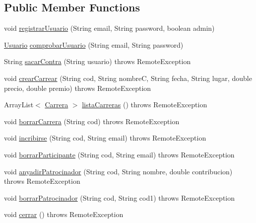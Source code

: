 \subsection*{Public Member Functions}
\begin{DoxyCompactItemize}
\item 
void \mbox{\hyperlink{classes_1_1deusto_1_1server_1_1_server_a0f79b8db6904facdae94410e26bef452}{registrar\+Usuario}} (String email, String password, boolean admin)
\item 
\mbox{\hyperlink{classes_1_1deusto_1_1server_1_1jdo_1_1_usuario}{Usuario}} \mbox{\hyperlink{classes_1_1deusto_1_1server_1_1_server_afa3e758715cbf321f9c1cbe08a8583a4}{comprobar\+Usuario}} (String email, String password)
\item 
String \mbox{\hyperlink{classes_1_1deusto_1_1server_1_1_server_aefe051d880626950ea2964d89a4ae3c3}{sacar\+Contra}} (String usuario)  throws Remote\+Exception 
\item 
void \mbox{\hyperlink{classes_1_1deusto_1_1server_1_1_server_a22d31cd9642f978f1995fc7822d99258}{crear\+Carrear}} (String cod, String nombreC, String fecha, String lugar, double precio, double premio)  throws Remote\+Exception 
\item 
Array\+List$<$ \mbox{\hyperlink{classes_1_1deusto_1_1server_1_1jdo_1_1_carrera}{Carrera}} $>$ \mbox{\hyperlink{classes_1_1deusto_1_1server_1_1_server_af62ce3462ec30a081db0009d2f2b33bb}{lista\+Carreras}} ()  throws Remote\+Exception 
\item 
void \mbox{\hyperlink{classes_1_1deusto_1_1server_1_1_server_a0a3160bdb7bfaab43143f1b0e68aee51}{borrar\+Carrera}} (String cod)  throws Remote\+Exception 
\item 
void \mbox{\hyperlink{classes_1_1deusto_1_1server_1_1_server_a19df52b26da7c83b2e7f13a6aab45633}{incribirse}} (String cod, String email)  throws Remote\+Exception 
\item 
void \mbox{\hyperlink{classes_1_1deusto_1_1server_1_1_server_a60cba3edcdffc7f50d4fa1f55b54ce76}{borrar\+Participante}} (String cod, String email)  throws Remote\+Exception 
\item 
void \mbox{\hyperlink{classes_1_1deusto_1_1server_1_1_server_ab38b8a38462608f1537cd7666e8ce0db}{anyadir\+Patrocinador}} (String cod, String nombre, double contribucion)  throws Remote\+Exception 
\item 
void \mbox{\hyperlink{classes_1_1deusto_1_1server_1_1_server_a0110ad2da18e4867bdc3321fb3871f7a}{borrar\+Patrocinador}} (String cod, String cod1)  throws Remote\+Exception 
\item 
void \mbox{\hyperlink{classes_1_1deusto_1_1server_1_1_server_a14279d26e3b3cd38e1615f99b6c6899f}{cerrar}} ()  throws Remote\+Exception 
\end{DoxyCompactItemize}
